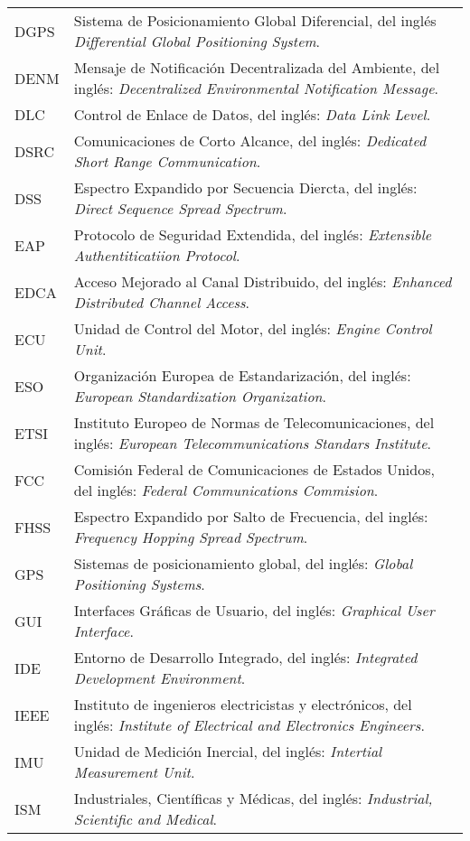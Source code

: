 \pagebreak
\begin{tabular}{p{2cm} p{13.3cm}}
DGPS & Sistema de Posicionamiento Global Diferencial, del inglés \textit{Differential Global Positioning System}.\\
DENM & Mensaje de Notificación Decentralizada del Ambiente, del inglés: \textit{Decentralized Environmental Notification Message}.\\
DLC & Control de Enlace de Datos, del inglés: \textit{Data Link Level}.\\
DSRC & Comunicaciones de Corto Alcance, del inglés: \textit{ Dedicated Short Range Communication}.\\
DSS & Espectro Expandido por Secuencia Diercta, del inglés: \textit{Direct Sequence Spread Spectrum}.\\
EAP & Protocolo de Seguridad Extendida, del inglés: \textit{Extensible Authentiticatiion Protocol}.\\ 
EDCA & Acceso Mejorado al Canal Distribuido, del inglés: \textit{Enhanced Distributed Channel Access}.\\
ECU & Unidad de Control del Motor, del inglés: \textit{Engine Control Unit}.\\
ESO & Organización Europea de Estandarización, del inglés: \textit{European Standardization Organization}.\\
ETSI & Instituto Europeo de Normas de Telecomunicaciones, del inglés: \textit{ European Telecommunications Standars Institute}.\\
FCC & Comisión Federal de Comunicaciones de Estados Unidos, del inglés: \textit{Federal Communications Commision}.\\
FHSS & Espectro Expandido por Salto de Frecuencia, del inglés: \textit{ Frequency Hopping Spread Spectrum}.\\
GPS & Sistemas de posicionamiento global, del inglés: \textit{Global Positioning Systems}.\\
GUI & Interfaces Gráficas de Usuario, del inglés: \textit{Graphical User Interface}.\\
IDE & Entorno de Desarrollo Integrado, del inglés: \textit{Integrated Development Environment}.\\
IEEE & Instituto de ingenieros electricistas y electrónicos, del inglés: \textit{Institute of Electrical and Electronics Engineers}.\\
IMU & Unidad de Medición Inercial, del inglés: \textit{Intertial Measurement Unit}.\\
ISM & Industriales, Científicas y Médicas, del inglés: \textit{Industrial, Scientific and Medical}.\\

\end{tabular}

